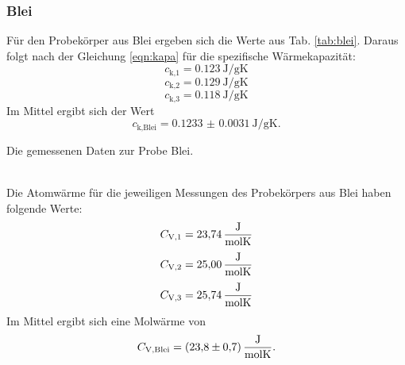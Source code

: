 \subsubsection{Blei}
Für den Probekörper aus Blei ergeben sich die Werte aus Tab. \ref{tab:blei}.
Daraus folgt nach der Gleichung \eqref{eqn:kapa} für die spezifische Wärmekapazität:
\begin{equation*}
    c_\text{k,1} = \SI{0.123}{\joule/\gram\kelvin}
\end{equation*}
\begin{equation*}
    c_\text{k,2} = \SI{0.129}{\joule/\gram\kelvin}
\end{equation*}
\begin{equation*}
    c_\text{k,3} = \SI{0.118}{\joule/\gram\kelvin}
\end{equation*}
Im Mittel ergibt sich der Wert
\begin{equation}
    c_\text{k,Blei} = \SI{0.1233(31)}{\joule/\gram\kelvin}.
\end{equation}
\begin{table}
    \centering
    \caption{Die gemessenen Daten zur Probe Blei. }
    \label{tab:blei}  
\end{table}
\\
Die Atomwärme für die jeweiligen Messungen des Probekörpers aus Blei haben folgende Werte:
\begin{equation*}
    C_\text{V,1} = \SI{23.74}{\frac{\joule}{\mol\kelvin}}
\end{equation*}
\begin{equation*}
    C_\text{V,2} = \SI{25.00}{\frac{\joule}{\mol\kelvin}}
\end{equation*}
\begin{equation*}
    C_\text{V,3} = \SI{25.74}{\frac{\joule}{\mol\kelvin}}
\end{equation*}
Im Mittel ergibt sich eine Molwärme von
\begin{equation}
    C_\text{V,Blei} = \SI{23.8(7)}{\frac{\joule}{\mol\kelvin}} .
\end{equation}


